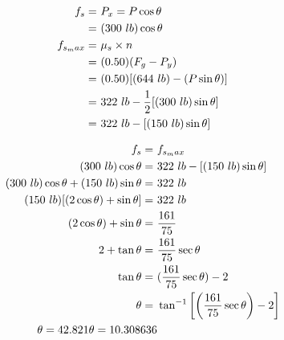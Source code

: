 	\begin{align}
		f_{s} = \ &P_{x} = P \cos \theta & \notag \\
		= \ &(300 \ lb) \cos \theta & \notag \\
		f_{s_max} = \ &\mu_{s} \times n& \notag \\
		= \ &(0.50)(F_{g} - P_{y})& \notag \\
		= \ &(0.50)[(644 \ lb) - (P \sin \theta)]& \notag \\
		= \ &322 \ lb - \frac{1}{2}[(300 \ lb) \sin \theta]& \notag \\
		= \ &322 \ lb - [(150 \ lb)\sin \theta]& \notag
	\end{align}

	\begin{align}
		f_{s} = \ &f_{s_max}& \notag \\
		(300 \ lb) \cos \theta = \ &322 \ lb - [(150 \ lb)\sin \theta]& \notag \\
		(300 \ lb) \cos \theta + (150 \ lb)\sin \theta = \ &322 \ lb& \notag \\
		(150 \ lb)[(2 \cos \theta) + \sin \theta] = \ &322 \ lb& \notag \\
		(2 \cos \theta) + \sin \theta = \ &\frac{161}{75}& \notag \\
		2 + \tan \theta = \ &\frac{161}{75} \sec \theta& \notag \\
		\tan \theta = \ &(\frac{161}{75} \sec \theta) - 2& \notag \\
		\theta = \ &\tan^{-1} \left[ \left(\frac{161}{75} \sec \theta \right) - 2 \right]& \notag \\
		\theta = 42.821
		\theta = 10.308636
	\end{align}
